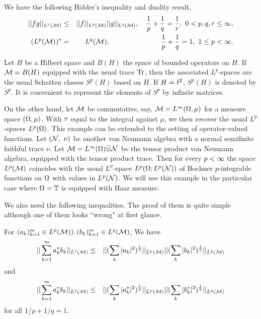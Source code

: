 We have the following H\"older's inequality and duality
result,\begin{eqnarray}
||fg||_{L^r({\mathcal M})}&\leq&||f||_{L^p({\mathcal M})}||g||_{L^q({\mathcal M})},\ \ \
 \frac1p+\frac1q=\frac1r,\ 0<p,q,r\leq\infty,\label{holder}\\
(L^p({\mathcal M}))^*&=&L^q({\mathcal M}),\ \ \hskip 2.3cm \frac1p+\frac1q=1,\ 1\leq
p<\infty. \label{dual}\end{eqnarray}

Let $H$ be a Hilbert space and $B(H)$ the space of bounded operators
on $H$. If ${\mathcal M}=B(H)$ equipped with the usual trace $\mbox{\rm Tr}$, then the
associated $L^p$-spaces are the usual Schatten classes $S^p(H)$
based on $H$. If $H=\ell^2$, $S^p(H)$ is denoted by $S^p$. It is
convenient to represent the elements of $S^p$ by infinite matrices.

On the other hand, let ${\mathcal M}$ be commutative, say, ${\mathcal M}=L^\infty({\Omega},\mu)$
for a measure space $({\Omega},\mu)$. With $\tau$ equal to the integral
against $\mu$, we then recover the usual $L^p$-spaces $L^p({\Omega})$.
This example can be extended to the setting of operator-valued
functions. Let $({\mathcal N},\;\nu)$ be another von Neumann algebra with a
normal semifinite faithful trace $\nu$. Let ${\mathcal M}=L^\infty({\Omega})\bar{\otimes}{\mathcal N}$
be the tensor product von Neumann algebra, equipped with the tensor
product trace. Then for every $p<\infty$ the space $L^p({\mathcal M})$ coincides
with the usual $L^p$-space $L^p({\Omega};L^p({\mathcal N}))$ of Bochner
$p$-integrable functions on ${\Omega}$ with values in $L^p({\mathcal N})$. We will
use this example in the particular case where ${\Omega}={{\mathbb T}}$ is equipped
with Haar measure.

We also need the following inequalities. The proof of them is quite
simple although one of them looks ``wrong" at first glance.
\begin{lemma}\label{ab}
For $(a_k)_{k=1}^m\in L^p({\mathcal M})), (b_k)_{k=1}^m\in L^q({\mathcal M})$, We have
\begin{eqnarray}
||\sum_{k=1}^ma_k^*b_k||_{L^1({\mathcal M})} &\leq &||(\sum_k|a_k|^2)^{\frac
12}||_{L^p({\mathcal M})}||(\sum_k|b_k|^2)^{\frac 12}||_{{L^q({\mathcal M})}}
\label{ab1}
\end{eqnarray}
and
\begin{eqnarray}
||\sum_{k=1}^ma_k^*b_k||_{L^1({\mathcal M})} &\leq &||(\sum_k|a_k^*|^2)^{\frac
12}||_{L^p({\mathcal M})}||(\sum_k|b_k^*|^2)^{\frac 12}||_{{L^q({\mathcal M})}}
 \label{ab2}
\end{eqnarray}
for all $1/p+1/q=1$.
\end{lemma}

